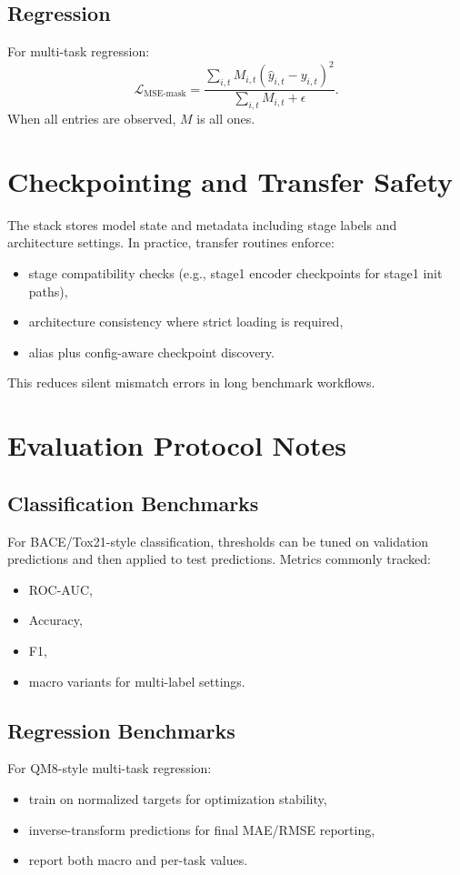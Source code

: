 \documentclass[11pt,a4paper]{article}
\begin{document}
\subsection{Regression}
For multi-task regression:
\begin{equation}
\mathcal{L}_{\text{MSE-mask}} = \frac{\sum_{i,t} M_{i,t}(\hat{y}_{i,t}-y_{i,t})^2}{\sum_{i,t} M_{i,t} + \epsilon}.
\end{equation}
When all entries are observed, $M$ is all ones.

\section{Checkpointing and Transfer Safety}
The stack stores model state and metadata including stage labels and architecture settings. In practice, transfer routines enforce:
\begin{itemize}
    \item stage compatibility checks (e.g., stage1 encoder checkpoints for stage1 init paths),
    \item architecture consistency where strict loading is required,
    \item alias plus config-aware checkpoint discovery.
\end{itemize}

This reduces silent mismatch errors in long benchmark workflows.

\section{Evaluation Protocol Notes}
\subsection{Classification Benchmarks}
For BACE/Tox21-style classification, thresholds can be tuned on validation predictions and then applied to test predictions. Metrics commonly tracked:
\begin{itemize}
    \item ROC-AUC,
    \item Accuracy,
    \item F1,
    \item macro variants for multi-label settings.
\end{itemize}

\subsection{Regression Benchmarks}
For QM8-style multi-task regression:
\begin{itemize}
    \item train on normalized targets for optimization stability,
    \item inverse-transform predictions for final MAE/RMSE reporting,
    \item report both macro and per-task values.
\end{itemize}
\end{document}
